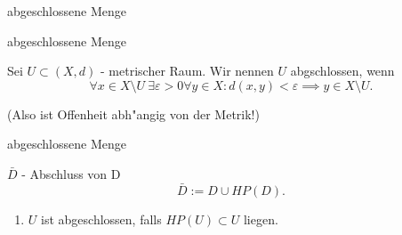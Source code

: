 \documentclass[class=article, crop=false]{standalone}
\begin{document}
\begin{zettel}{abgeschlossene Menge}
\begin{flashcard}[sw2uo1mc]{abgeschlossene Menge}
	\begin{definition}[abgeschlossen]
		Sei $U \subset (X,d)$ - metrischer Raum. Wir nennen $U$ abgschlossen, wenn
		\[
			\forall x \in  X \setminus U \  \exists \varepsilon > 0 \forall y \in X : d(x,y) < \varepsilon \implies y \in  X \setminus U
		.\]

		(Also ist Offenheit abh"angig von der Metrik!)
	\end{definition}
\end{flashcard}

\begin{flashcard}[sqeveclw]{abgeschlossene Menge}
	\begin{definition}[Abschluss]
		$ \bar{D} $ - Abschluss von D
		\[
			\bar{D} := D \cup HP(D)
		.\]
	\end{definition}
\end{flashcard}

\begin{enumerate}
	\item $U$ ist abgeschlossen, falls $HP(U) \subset U$ liegen.
\end{enumerate}

\end{zettel}
\end{document}
